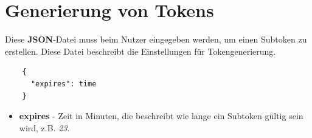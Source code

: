 \documentclass[a4paper,20pt,oneside]{book}
\begin{document}
    \section{Generierung von Tokens}
    Diese \textbf{JSON}-Datei muss beim Nutzer eingegeben werden, um einen Subtoken zu erstellen. Diese Datei beschreibt die Einstellungen für Tokengenerierung.
    \begin{lstlisting}
    {
      "expires": time
    }
    \end{lstlisting}
    \begin{itemize}
    	\item \textbf{expires} - Zeit in Minuten, die beschreibt wie lange ein Subtoken gültig sein wird, z.B. \textit{23}.
 
    \end{itemize}
    
    
	
		
	
	\printglossaries
\end{document}
